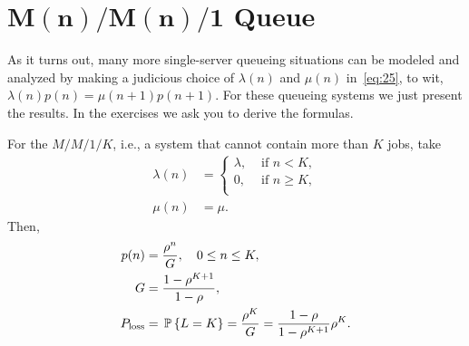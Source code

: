 \section
[$M(n)/M(n)/1$ Queue]
{$\mathbf{M(n)/M(n)/1}$ Queue}
\label{sec:mnmn1}

As it turns out, many more single-server queueing situations can be
modeled and analyzed by making a judicious choice of $\lambda(n)$ and
$\mu(n)$ in~\eqref{eq:25}, to wit,
$ \lambda(n) p(n) = \mu(n+1)p(n+1)$. For these queueing systems we
just present the results. In the exercises we ask you to derive the
formulas.

For the $M/M/1/K$, i.e., a system that cannot contain more than $K$ jobs, take
  \begin{align*}
    \lambda(n) &= 
  \begin{cases}
    \lambda, &\text{ if } n < K, \\
    0, &\text{ if } n \geq K, \\
  \end{cases} \\
\mu(n) &= \mu.
  \end{align*}
  Then,
\begin{subequations}\label{eq:8}
 \begin{align}
p(n) &=  \frac{\rho^n}G, \quad 0\leq n \leq K,\\
G &= \frac{1-\rho^{K+1}}{1-\rho}, \\
P_{\text{loss}} &= \P{L=K} = \frac{\rho^K}G = \frac{1-\rho}{1-\rho^{K+1}} \rho^K.
\end{align}
\end{subequations}



